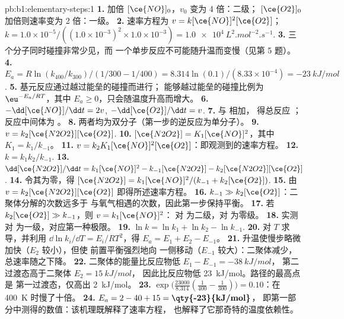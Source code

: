 \begin{solution}{pb:b1:elementary-steps:1}
\textbf{1.} 加倍 $[\ce{NO}]_0$，$v_0$ 变为 4 倍：二级；
$[\ce{O2}]_0$ 加倍则速率变为 2 倍：一级。
\textbf{2.} 速率方程为 $v = k[\ce{NO}]^2[\ce{O2}]$；$k = 1.0 \times 10^{-5}/((1.0
\times 10^{-3})^2 \times 1.0 \times 10^{-3}) =
\qty{1.0e4}{L^2.mol^{-2}.s^{-1}}$.
\textbf{3.} 三个分子同时碰撞非常少见，而
一个单步反应不可能随升温而变慢（见第 5 题）。
\textbf{4.} $E_a = R\ln(k_{400}/k_{300})/(1/300 - 1/400) = 8.314 \ln(0.1)
/(8.33 \times 10^{-4}) = \qty{-23}{kJ/mol}$.
\textbf{5.} 基元反应通过越过能垒的碰撞而进行；
能够越过能垒的碰撞比例为 $\eu^{-E_a/RT}$，其中 $E_a \ge
0$，只会随温度升高而增大。
\textbf{6.} $-\dd[\ce{NO}]/\dd t = 2v$, $-\dd[\ce{O2}]/\dd t = v$.
\textbf{7.}  与  相加，
得总反应 ；反应中间体为 。
\textbf{8.} 两者均为双分子（第一步的逆反应为单分子）。
\textbf{9.} $v = k_2[\ce{N2O2}][\ce{O2}]$.
\textbf{10.} $[\ce{N2O2}] = K_1[\ce{NO}]^2$，其中 $K_1 = k_1/k_{-1}$。
\textbf{11.} $v = k_2K_1[\ce{NO}]^2[\ce{O2}]$：即观测到的速率方程。
\textbf{12.} $k = k_1k_2/k_{-1}$.
\textbf{13.} $\dd[\ce{N2O2}]/\dd t = k_1[\ce{NO}]^2 - k_{-1}[\ce{N2O2}] -
k_2[\ce{N2O2}][\ce{O2}]$.
\textbf{14.} 令其为零，得 $[\ce{N2O2}] = k_1[\ce{NO}]^2/(k_{-1} +
k_2[\ce{O2}])$.
\textbf{15.} 由 $v = k_2[\ce{N2O2}][\ce{O2}]$ 即得所述速率方程。
\textbf{16.} $k_{-1} \gg k_2[\ce{O2}]$：二聚体分解的次数远多于
与氧气相遇的次数，因此第一步保持平衡。
\textbf{17.} 若 $k_2[\ce{O2}] \gg k_{-1}$，则 $v = k_1[\ce{NO}]^2$：
对  为二级，对  为零级。
\textbf{18.} 实测对  为一级，对应第一种极限。
\textbf{19.} $\ln k = \ln k_1 + \ln k_2 - \ln k_{-1}$.
\textbf{20.} 对 $T$ 求导，并利用 $\dd\ln k_i/\dd T
= E_i/RT^2$，得 $E_a = E_1 + E_2 - E_{-1}$。
\textbf{21.} 升温使慢步略微加快（$E_2$ 较小），但使
前置平衡强烈地向  一侧移动（$E_{-1}$ 较大）：二聚体减少，
总速率随之下降。
\textbf{22.} 二聚体的能量比反应物低 $E_1 - E_{-1} = \qty{-38}{kJ/mol}$，
第二过渡态高于二聚体 $E_2 = \qty{15}{kJ/mol}$，
因此比反应物低 \qty{23}{kJ/mol}。路径的最高点是
第一过渡态，仅高出 \qty{2}{kJ/mol}。
\textbf{23.} $\exp\big(\frac{23000}{8.314}(\frac{1}{400} - \frac{1}{300})\big)
= 0.10$：在 \qty{400}{K} 时慢了十倍。
\textbf{24.} $E_a = 2 - 40 + 15 = \textbf{\qty{-23}{kJ/mol}}$，
即第一部分中测得的数值：该机理既解释了速率方程，
也解释了它那奇特的温度依赖性。
\end{solution}
